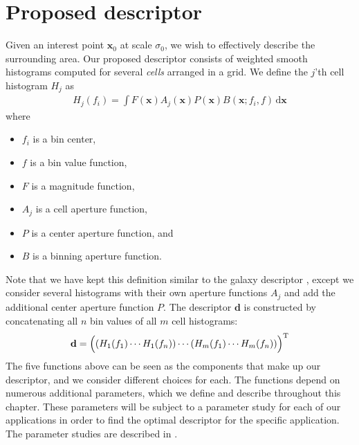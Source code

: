 \documentclass[thesis.tex]{subfiles}
\def\x{\mathbf{x}}
\def\d{\mathbf{d}}
\begin{document}
\chapter{Proposed descriptor}
%
Given an interest point $\x_0$ at scale $\sigma_0$, we wish to effectively describe the surrounding area. Our proposed descriptor consists of weighted smooth histograms computed for several \textit{cells} arranged in a grid. We define the $j$'th cell histogram $H_j$ as
%
\begin{align}
\label{eq:proposed_histogram}
H_j(f_i) = \int F(\x) A_j (\x) P (\x) B(\x; f_i,f) \,\text{d} \x
\end{align}
%
where
%
\begin{itemize}
\item[] $f_i$ is a bin center,
\item[] $f$ is a bin value function,
\item[] $F$ is a magnitude function,
\item[] $A_j$ is a cell aperture function,
\item[] $P$ is a center aperture function, and
\item[] $B$ is a binning aperture function.
\end{itemize}
%
Note that we have kept this definition similar to the galaxy descriptor \cite{pedersen2013shape}, except we consider several histograms with their own aperture functions $A_j$ and add the additional center aperture function $P$. The descriptor $\d$ is constructed by concatenating all $n$ bin values of all $m$ cell histograms:
%
\begin{align}
\label{eq:proposed_descriptor}
\d = \Bigl( \left(H_1(f_1) \cdots H_1(f_n)\right) \cdots (H_m(f_1) \cdots H_m(f_n)) \Bigr) ^\text{T}
\end{align}
%
The five functions above can be seen as the components that make up our descriptor, and we consider different choices for each. The functions depend on numerous additional parameters, which we define and describe throughout this chapter. These parameters will be subject to a parameter study for each of our applications in order to find the optimal descriptor for the specific application. The parameter studies are described in .
%
\end{document}
